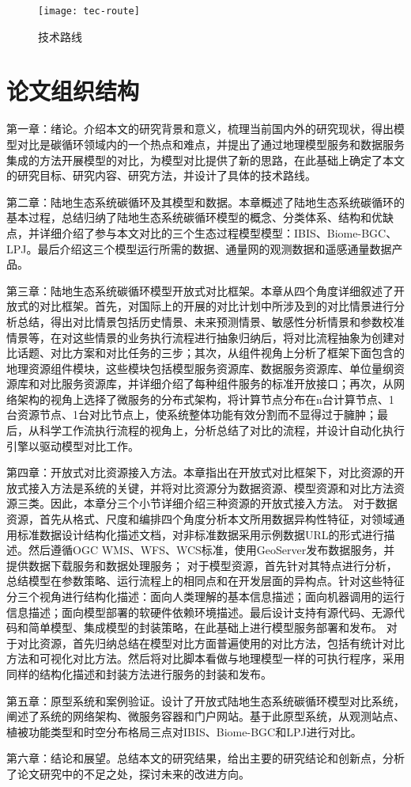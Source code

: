 \begin{figure}[!htbp]
    \centering
    \texttt{[image: tec-route]}
    \caption{技术路线}
    \label{fig:tec-route}
\end{figure}

\section{论文组织结构}
第一章：绪论。介绍本文的研究背景和意义，梳理当前国内外的研究现状，得出模型对比是碳循环领域内的一个热点和难点，并提出了通过地理模型服务和数据服务集成的方法开展模型的对比，为模型对比提供了新的思路，在此基础上确定了本文的研究目标、研究内容、研究方法，并设计了具体的技术路线。

第二章：陆地生态系统碳循环及其模型和数据。本章概述了陆地生态系统碳循环的基本过程，总结归纳了陆地生态系统碳循环模型的概念、分类体系、结构和优缺点，并详细介绍了参与本文对比的三个生态过程模型模型：IBIS、Biome-BGC、LPJ。最后介绍这三个模型运行所需的数据、通量网的观测数据和遥感通量数据产品。

第三章：陆地生态系统碳循环模型开放式对比框架。本章从四个角度详细叙述了开放式的对比框架。首先，对国际上的开展的对比计划中所涉及到的对比情景进行分析总结，得出对比情景包括历史情景、未来预测情景、敏感性分析情景和参数校准情景等，在对这些情景的业务执行流程进行抽象归纳后，将对比流程抽象为创建对比话题、对比方案和对比任务的三步；其次，从组件视角上分析了框架下面包含的地理资源组件模块，这些模块包括模型服务资源库、数据服务资源库、单位量纲资源库和对比服务资源库，并详细介绍了每种组件服务的标准开放接口；再次，从网络架构的视角上选择了微服务的分布式架构，将计算节点分布在n台计算节点、1台资源节点、1台对比节点上，使系统整体功能有效分割而不显得过于臃肿；最后，从科学工作流执行流程的视角上，分析总结了对比的流程，并设计自动化执行引擎以驱动模型对比工作。

第四章：开放式对比资源接入方法。本章指出在开放式对比框架下，对比资源的开放式接入方法是系统的关键，并将对比资源分为数据资源、模型资源和对比方法资源三类。因此，本章分三个小节详细介绍三种资源的开放式接入方法。
对于数据资源，首先从格式、尺度和编排四个角度分析本文所用数据异构性特征，对领域通用标准数据设计结构化描述文档，对非标准数据采用示例数据URL的形式进行描述。然后遵循OGC WMS、WFS、WCS标准，使用GeoServer发布数据服务，并提供数据下载服务和数据处理服务；
对于模型资源，首先针对其特点进行分析，总结模型在参数策略、运行流程上的相同点和在开发层面的异构点。针对这些特征分三个视角进行结构化描述：面向人类理解的基本信息描述；面向机器调用的运行信息描述；面向模型部署的软硬件依赖环境描述。最后设计支持有源代码、无源代码和简单模型、集成模型的封装策略，在此基础上进行模型服务部署和发布。
对于对比资源，首先归纳总结在模型对比方面普遍使用的对比方法，包括有统计对比方法和可视化对比方法。然后将对比脚本看做与地理模型一样的可执行程序，采用同样的结构化描述和封装方法进行服务的封装和发布。

第五章：原型系统和案例验证。设计了开放式陆地生态系统碳循环模型对比系统，阐述了系统的网络架构、微服务容器和门户网站。基于此原型系统，从观测站点、植被功能类型和时空分布格局三点对IBIS、Biome-BGC和LPJ进行对比。

第六章：结论和展望。总结本文的研究结果，给出主要的研究结论和创新点，分析了论文研究中的不足之处，探讨未来的改进方向。